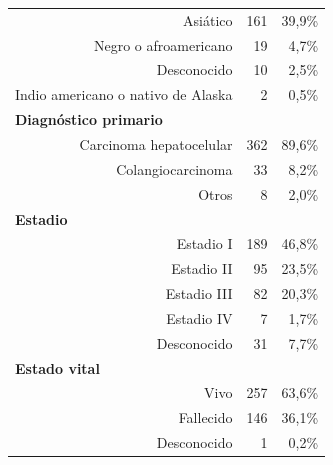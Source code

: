 \begin{table}[H]
\begin{tabular}{rrr}
		Asiático                                          & 161                      & 39,9\%                    \\
		Negro o afroamericano                             & 19                       & 4,7\%                     \\
		Desconocido                                       & 10                       & 2,5\%                     \\
		Indio americano o nativo de Alaska                & 2                        & 0,5\%                     \\ \hline
		\multicolumn{1}{l}{\textbf{Diagnóstico primario}} &                          &                           \\
		Carcinoma hepatocelular                           & 362                      & 89,6\%                    \\
		Colangiocarcinoma                                 & 33                       & 8,2\%                     \\
		Otros                                             & 8                        & 2,0\%                       \\ \hline
		\multicolumn{1}{l}{\textbf{Estadio}}              &                          &                           \\
		Estadio I                                         & 189                      & 46,8\%                    \\
		Estadio II                                        & 95                       & 23,5\%                    \\
		Estadio III                                       & 82                       & 20,3\%                    \\
		Estadio IV                                        & 7                        & 1,7\%                     \\
		Desconocido                                       & 31                       & 7,7\%                     \\ \hline
		\multicolumn{1}{l}{\textbf{Estado vital}}         &                          &                           \\
		Vivo                                              & 257                      & 63,6\%                    \\
		Fallecido                                         & 146                      & 36,1\%                    \\
		Desconocido                                       & 1                        & 0,2\%                     \\ \hline
	\end{tabular}
\end{table}


